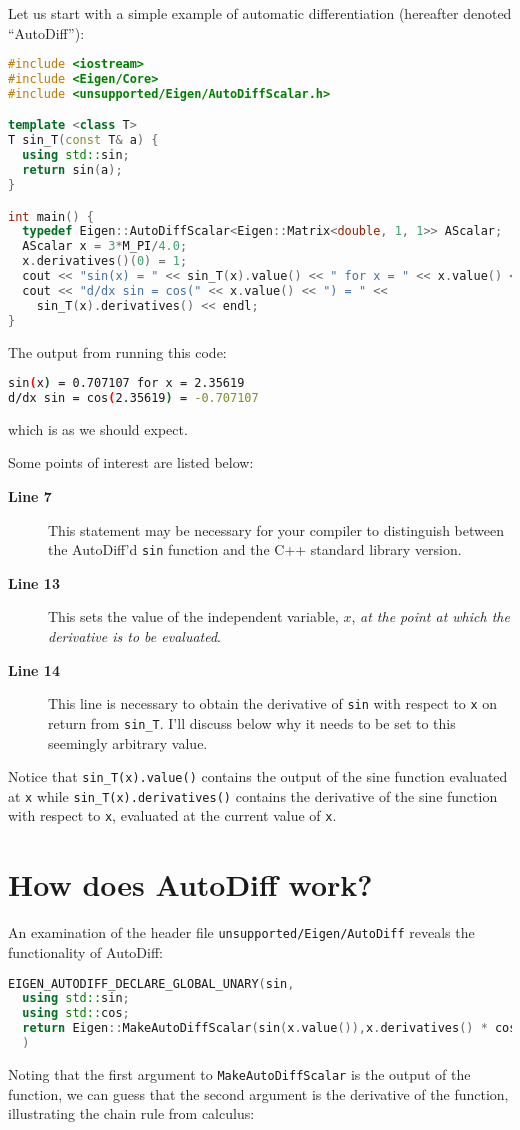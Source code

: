 \documentclass[letterpaper, 12 pt, onecolumn, journal]{IEEEtran}  %
\begin{document}
Let us start with a simple example of automatic differentiation (hereafter denoted ``AutoDiff''):
\begin{lstlisting}[language=C++]
#include <iostream>
#include <Eigen/Core>
#include <unsupported/Eigen/AutoDiffScalar.h>

template <class T>
T sin_T(const T& a) {
  using std::sin;
  return sin(a);
}

int main() {
  typedef Eigen::AutoDiffScalar<Eigen::Matrix<double, 1, 1>> AScalar;
  AScalar x = 3*M_PI/4.0;
  x.derivatives()(0) = 1;
  cout << "sin(x) = " << sin_T(x).value() << " for x = " << x.value() << endl;
  cout << "d/dx sin = cos(" << x.value() << ") = " << 
    sin_T(x).derivatives() << endl;
}
\end{lstlisting}
The output from running this code:
\begin{lstlisting}[language=bash]
sin(x) = 0.707107 for x = 2.35619
d/dx sin = cos(2.35619) = -0.707107
\end{lstlisting}
which is as we should expect.

Some points of interest are listed below:
\begin{description}
 \item [\textbf{Line 7} ]\quad This statement may be necessary for your compiler to distinguish between the AutoDiff'd \texttt{sin} function and the C++ standard library version.
 \item [\textbf{Line 13} ]\quad This sets the value of the independent variable, $x$, \emph{at the point at which the derivative is to be evaluated}.
 \item [\textbf{Line 14}\ ]\quad This line is necessary to obtain the derivative of \texttt{sin} with respect to \texttt{x} on return from \texttt{sin\_T}. I'll discuss below why it needs to be set to this seemingly arbitrary value.
\end{description}

\raggedright
Notice that \texttt{sin\_T(x).value()} contains the output of the sine function evaluated at \texttt{x} while \texttt{sin\_T(x).derivatives()} contains the derivative of the sine function with respect to \texttt{x}, evaluated at the current value of \texttt{x}.
\flushleft

\section{How does AutoDiff work?}
\label{section:chain-rule}
An examination of the header file \texttt{unsupported/Eigen/AutoDiff} reveals the functionality of AutoDiff:
\begin{lstlisting}[language=C++]
EIGEN_AUTODIFF_DECLARE_GLOBAL_UNARY(sin,
  using std::sin;
  using std::cos;
  return Eigen::MakeAutoDiffScalar(sin(x.value()),x.derivatives() * cos(x.value()));
  )
\end{lstlisting}
Noting that the first argument to \texttt{MakeAutoDiffScalar} is the output of the function, we can guess that the second argument is the derivative of the function, illustrating the chain rule from calculus:
\end{document}
